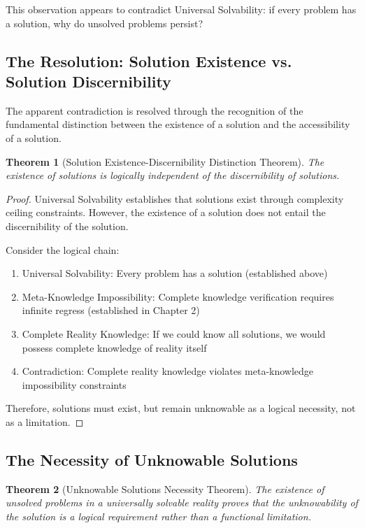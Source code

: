 \documentclass[12pt,a4paper]{article}
\newtheorem{theorem}{Theorem}[section]
\begin{document}
This observation appears to contradict Universal Solvability: if every problem has a solution, why do unsolved problems persist?

\subsection{The Resolution: Solution Existence vs. Solution Discernibility}

The apparent contradiction is resolved through the recognition of the fundamental distinction between the existence of a solution and the accessibility of a solution.

\begin{theorem}[Solution Existence-Discernibility Distinction Theorem]
The existence of solutions is logically independent of the discernibility of solutions.
\end{theorem}

\begin{proof}
Universal Solvability establishes that solutions exist through complexity ceiling constraints. However, the existence of a solution does not entail the discernibility of the solution. 

Consider the logical chain:
\begin{enumerate}
\item Universal Solvability: Every problem has a solution (established above)
\item Meta-Knowledge Impossibility: Complete knowledge verification requires infinite regress (established in Chapter 2)
\item Complete Reality Knowledge: If we could know all solutions, we would possess complete knowledge of reality itself
\item Contradiction: Complete reality knowledge violates meta-knowledge impossibility constraints
\end{enumerate}

Therefore, solutions must exist, but remain unknowable as a logical necessity, not as a limitation.
\end{proof}

\subsection{The Necessity of Unknowable Solutions}

\begin{theorem}[Unknowable Solutions Necessity Theorem]
The existence of unsolved problems in a universally solvable reality proves that the unknowability of the solution is a logical requirement rather than a functional limitation.
\end{theorem}
\end{document}
